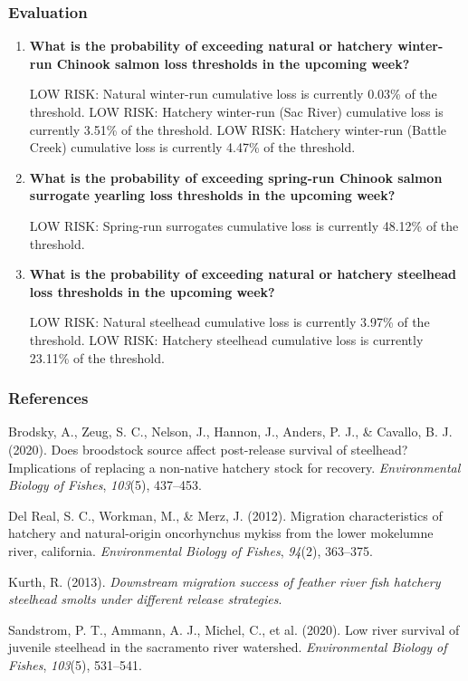 \documentclass[
  letterpaper,
  DIV=11,
  numbers=noendperiod]{scrartcl}
\newlength{\cslhangindent}
\newenvironment{CSLReferences}[2] %
 {\begin{list}{}{%
  \setlength{\itemindent}{0pt}
  \setlength{\leftmargin}{0pt}
  \setlength{\parsep}{0pt}
  \ifodd #1
   \setlength{\leftmargin}{\cslhangindent}
   \setlength{\itemindent}{-1\cslhangindent}
  \fi
  \setlength{\itemsep}{#2\baselineskip}}}
 {\end{list}}
\begin{document}
\subsubsection{Evaluation}\label{evaluation}

\begin{enumerate}
\def\labelenumi{\arabic{enumi}.}
\item
  \textbf{What is the probability of exceeding natural or hatchery
  winter-run Chinook salmon loss thresholds in the upcoming week?}

  LOW RISK: Natural winter-run cumulative loss is currently 0.03\% of
  the threshold. LOW RISK: Hatchery winter-run (Sac River) cumulative
  loss is currently 3.51\% of the threshold. LOW RISK: Hatchery
  winter-run (Battle Creek) cumulative loss is currently 4.47\% of the
  threshold.
\item
  \textbf{What is the probability of exceeding spring-run Chinook salmon
  surrogate yearling loss thresholds in the upcoming week?}

  LOW RISK: Spring-run surrogates cumulative loss is currently 48.12\%
  of the threshold.
\item
  \textbf{What is the probability of exceeding natural or hatchery
  steelhead loss thresholds in the upcoming week?}

  LOW RISK: Natural steelhead cumulative loss is currently 3.97\% of the
  threshold. LOW RISK: Hatchery steelhead cumulative loss is currently
  23.11\% of the threshold.
\end{enumerate}

\newpage{}

\subsubsection*{References}\label{references}

\label{refs}
\begin{CSLReferences}{1}{0}
Brodsky, A., Zeug, S. C., Nelson, J., Hannon, J., Anders, P. J., \&
Cavallo, B. J. (2020). Does broodstock source affect post-release
survival of steelhead? Implications of replacing a non-native hatchery
stock for recovery. \emph{Environmental Biology of Fishes},
\emph{103}(5), 437--453.

Del Real, S. C., Workman, M., \& Merz, J. (2012). Migration
characteristics of hatchery and natural-origin oncorhynchus mykiss from
the lower mokelumne river, california. \emph{Environmental Biology of
Fishes}, \emph{94}(2), 363--375.

Kurth, R. (2013). \emph{Downstream migration success of feather river
fish hatchery steelhead smolts under different release strategies}.

Sandstrom, P. T., Ammann, A. J., Michel, C., et al. (2020). Low river
survival of juvenile steelhead in the sacramento river watershed.
\emph{Environmental Biology of Fishes}, \emph{103}(5), 531--541.

\end{CSLReferences}
\end{document}
